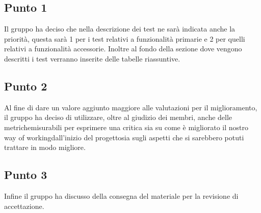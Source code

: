     \subsection{Punto 1} 
    Il gruppo ha deciso che nella descrizione dei test ne sarà indicata anche la priorità, questa sarà 1 per i test relativi a funzionalità primarie e 2 per quelli relativi a funzionalità accessorie.
    Inoltre al fondo della sezione dove vengono descritti i test verranno inserite delle tabelle riassuntive.
    \subsection{Punto 2}
    Al fine di dare un valore aggiunto maggiore alle valutazioni per il miglioramento, il gruppo ha deciso di utilizzare, oltre al giudizio dei membri, anche delle metriche\glosp misurabili per esprimere una critica sia su come è migliorato il nostro way of working\glosp dall'inizio del progetto\glosp sia sugli aspetti che si sarebbero potuti trattare in modo migliore.
    \subsection{Punto 3}
    Infine il gruppo ha discusso della consegna del materiale per la revisione di accettazione.
